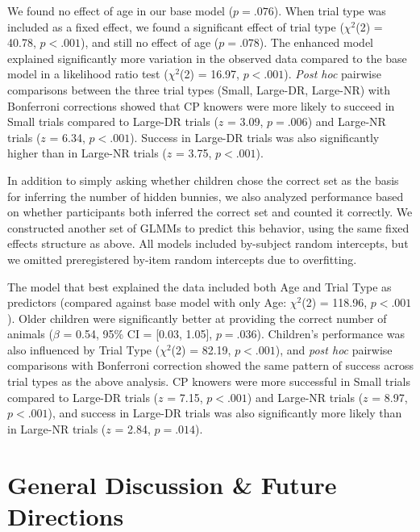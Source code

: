 \documentclass[10pt, letterpaper]{article}
\begin{document}
We found no effect of age in our base model (\(p = .076\)). When trial
type was included as a fixed effect, we found a significant effect of
trial type (\(\chi^2\)(2) = 40.78, \(p < .001\)), and still no effect of
age (\(p = .078\)). The enhanced model explained significantly more
variation in the observed data compared to the base model in a
likelihood ratio test (\(\chi^2\)(2) = 16.97, \(p < .001\)). \emph{Post
hoc} pairwise comparisons between the three trial types (Small,
Large-DR, Large-NR) with Bonferroni corrections showed that CP knowers
were more likely to succeed in Small trials compared to Large-DR trials
(\(z\) = 3.09, \(p = .006\)) and Large-NR trials (\(z\) = 6.34,
\(p < .001\)). Success in Large-DR trials was also significantly higher
than in Large-NR trials (\(z\) = 3.75, \(p < .001\)).

In addition to simply asking whether children chose the correct set as
the basis for inferring the number of hidden bunnies, we also analyzed
performance based on whether participants both inferred the correct set
and counted it correctly. We constructed another set of GLMMs to predict
this behavior, using the same fixed effects structure as above. All
models included by-subject random intercepts, but we omitted
preregistered by-item random intercepts due to overfitting.

The model that best explained the data included both Age and Trial Type
as predictors (compared against base model with only Age: \(\chi^2\)(2)
= 118.96, \(p < .001\)). Older children were significantly better at
providing the correct number of animals (\(\beta\) = 0.54, 95\% CI =
{[}0.03, 1.05{]}, \(p = .036\)). Children's performance was also
influenced by Trial Type (\(\chi^2\)(2) = 82.19, \(p < .001\)), and
\emph{post hoc} pairwise comparisons with Bonferroni correction showed
the same pattern of success across trial types as the above analysis. CP
knowers were more successful in Small trials compared to Large-DR trials
(\(z\) = 7.15, \(p < .001\)) and Large-NR trials (\(z\) = 8.97,
\(p < .001\)), and success in Large-DR trials was also significantly
more likely than in Large-NR trials (\(z\) = 2.84, \(p = .014\)).

\hypertarget{general-discussion-future-directions}{%
\section{General Discussion \& Future
Directions}\label{general-discussion-future-directions}}
\end{document}
